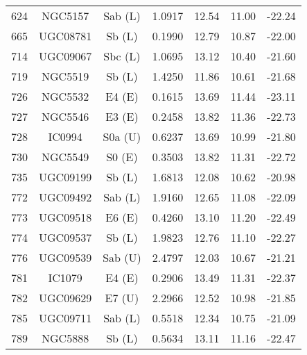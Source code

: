 \begin{tabular}{ccccccc}
624 &        NGC5157 &  Sab (L) &    1.0917 &  12.54 & 11.00 &  -22.24\\
665 &       UGC08781 &   Sb (L) &    0.1990 &  12.79 & 10.87 &  -22.00\\
714 &       UGC09067 &  Sbc (L) &    1.0695 &  13.12 & 10.40 &  -21.60\\ 
719 &        NGC5519 &   Sb (L) &    1.4250 &  11.86 & 10.61 &  -21.68\\
726 &        NGC5532 &   E4 (E) &    0.1615 &  13.69 & 11.44 &  -23.11\\
727 &        NGC5546 &   E3 (E) &    0.2458 &  13.82 & 11.36 &  -22.73\\
728 &         IC0994 &  S0a (U) &    0.6237 &  13.69 & 10.99 &  -21.80\\
730 &        NGC5549 &   S0 (E) &    0.3503 &  13.82 & 11.31 &  -22.72\\
735 &       UGC09199 &   Sb (L) &    1.6813 &  12.08 & 10.62 &  -20.98\\
772 &       UGC09492 &  Sab (L) &    1.9160 &  12.65 & 11.08 &  -22.09\\
773 &       UGC09518 &   E6 (E) &    0.4260 &  13.10 & 11.20 &  -22.49\\
774 &       UGC09537 &   Sb (L) &    1.9823 &  12.76 & 11.10 &  -22.27\\
776 &       UGC09539 &  Sab (U) &    2.4797 &  12.03 & 10.67 &  -21.21\\
781 &         IC1079 &   E4 (E) &    0.2906 &  13.49 & 11.31 &  -22.37\\
782 &       UGC09629 &   E7 (U) &    2.2966 &  12.52 & 10.98 &  -21.85\\
785 &       UGC09711 &  Sab (L) &    0.5518 &  12.34 & 10.75 &  -21.09\\
789 &        NGC5888 &   Sb (L) &    0.5634 &  13.11 & 11.16 &  -22.47\\
\hline
\end{tabular}

